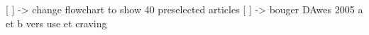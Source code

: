 [ ] -> change flowchart to show 40 preselected articles
[ ] -> bouger DAwes 2005 a et b vers use et craving